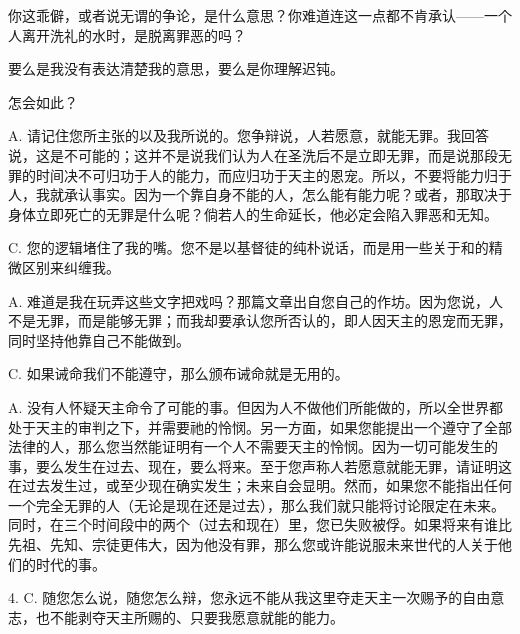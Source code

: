  你这乖僻，或者说无谓的争论，是什么意思？你难道连这一点都不肯承认——一个人离开洗礼的水时，是脱离罪恶的吗？\par

 要么是我没有表达清楚我的意思，要么是你理解迟钝。\par

 怎会如此？\par

A. 请记住您所主张的以及我所说的。您争辩说，人若愿意，就能无罪。我回答说，这是不可能的；这并不是说我们认为人在圣洗后不是立即无罪，而是说那段无罪的时间决不可归功于人的能力，而应归功于天主的恩宠。所以，不要将能力归于人，我就承认事实。因为一个靠自身不能的人，怎么能有能力呢？或者，那取决于身体立即死亡的无罪是什么呢？倘若人的生命延长，他必定会陷入罪恶和无知。\par

C. 您的逻辑堵住了我的嘴。您不是以基督徒的纯朴说话，而是用一些关于和的精微区别来纠缠我。\par

A. 难道是我在玩弄这些文字把戏吗？那篇文章出自您自己的作坊。因为您说，人不是无罪，而是能够无罪；而我却要承认您所否认的，即人因天主的恩宠而无罪，同时坚持他靠自己不能做到。\par

C. 如果诫命我们不能遵守，那么颁布诫命就是无用的。\par

A. 没有人怀疑天主命令了可能的事。但因为人不做他们所能做的，所以全世界都处于天主的审判之下，并需要祂的怜悯。另一方面，如果您能提出一个遵守了全部法律的人，那么您当然能证明有一个人不需要天主的怜悯。因为一切可能发生的事，要么发生在过去、现在，要么将来。至于您声称人若愿意就能无罪，请证明这在过去发生过，或至少现在确实发生；未来自会显明。然而，如果您不能指出任何一个完全无罪的人（无论是现在还是过去），那么我们就只能将讨论限定在未来。同时，在三个时间段中的两个（过去和现在）里，您已失败被俘。如果将来有谁比先祖、先知、宗徒更伟大，因为他没有罪，那么您或许能说服未来世代的人关于他们的时代的事。\par

4. C. 随您怎么说，随您怎么辩，您永远不能从我这里夺走天主一次赐予的自由意志，也不能剥夺天主所赐的、只要我愿意就能的能力。\par

